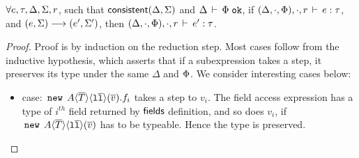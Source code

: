 \begin{lemma}[preservation]
\label{lem:preservation}
$\forall e, \tau, \Delta, \Sigma, r$, such that ${\sf consistent}(\Delta,\Sigma)$
and $\Delta\,\vdash\,\Phi \; \texttt{ok}$, if $(\Delta,\cdot,\Phi),
\cdot,r\,\vdash\,e:\tau$, and $(e,\Sigma) \longrightarrow (e',\Sigma')$, then 
$(\Delta,\cdot,\Phi),\cdot,r\,\vdash\,e':\tau$.
\end{lemma}
\begin{proof}
  Proof is by induction on the reduction step. Most cases follow from
  the inductive hypothesis, which asserts that if a subexpression
  takes a step, it preserves its type under the same $\Delta$ and
  $\Phi$. We consider interesting cases below:
  \begin{itemize}
    \item {} case: $\,{\tt new}\,\; A\langle \overline{T} \rangle
    \langle \mathtt{l}\overline{\mathtt{l}} \rangle(\overline{v}).f_i$ takes a step to $v_i$. The field
    access expression has a type of $i^{th}$ field returned by
    ${\sf fields}$ definition, and so does $v_i$, if $\,{\tt new}\,\;
    A\langle \overline{T} \rangle \langle \mathtt{l}\overline{\mathtt{l}} \rangle(\overline{v})$ has to be typeable.
    Hence the type is preserved.


\end{itemize}
\end{proof}
